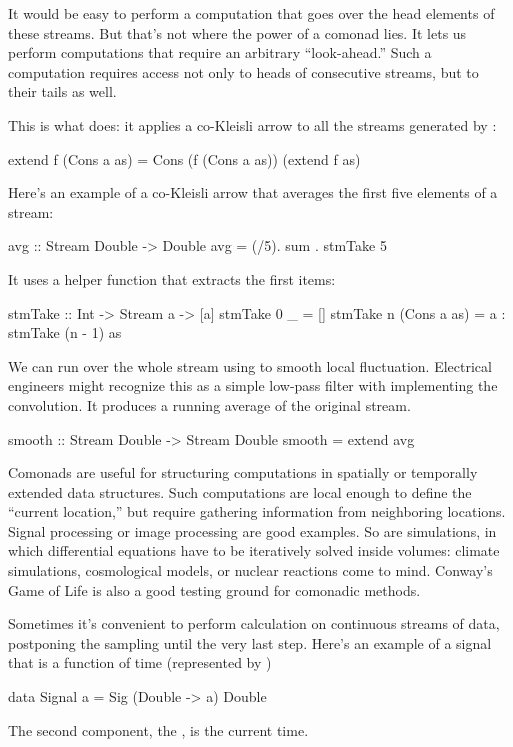 \documentclass[DaoFP]{subfiles}
\begin{document}
It would be easy to perform a computation that goes over the head elements of these streams. But that's not where the power of a comonad lies. It lets us perform computations that require an arbitrary ``look-ahead.''  Such a computation requires access not only to heads of consecutive streams, but to their tails as well.

This is what  does: it applies a co-Kleisli arrow to all the streams generated by :
\begin{haskell}
  extend f (Cons a as) = Cons (f (Cons a as)) (extend f as)
\end{haskell}

Here's an example of a co-Kleisli arrow that averages the first five elements of a stream:
\begin{haskell}
avg :: Stream Double -> Double
avg  = (/5). sum . stmTake 5
\end{haskell}
It uses a helper function that extracts the first  items:
\begin{haskell}
stmTake :: Int -> Stream a -> [a]
stmTake 0 _ = []
stmTake n (Cons a as) = a : stmTake (n - 1) as
\end{haskell}

We can run  over the whole stream using  to smooth local fluctuation. Electrical engineers might recognize this as a simple low-pass filter with  implementing the convolution. It produces a running average of the original stream. 
\begin{haskell}
smooth :: Stream Double -> Stream Double
smooth = extend avg
\end{haskell}


Comonads are useful for structuring computations in spatially or temporally extended data structures. Such computations are local enough to define the ``current location,'' but require gathering information from neighboring locations. Signal processing or image processing are good examples. So are simulations, in which differential equations have to be iteratively solved inside volumes: climate simulations, cosmological models, or nuclear reactions come to mind. Conway's Game of Life is also a good testing ground for comonadic methods.

Sometimes it's convenient to perform calculation on continuous streams of data, postponing the sampling until the very last step. Here's an example of a signal that is a function of time (represented by )
\begin{haskell}
data Signal a = Sig (Double -> a) Double
\end{haskell}
The second component, the , is the current time.
\end{document}
